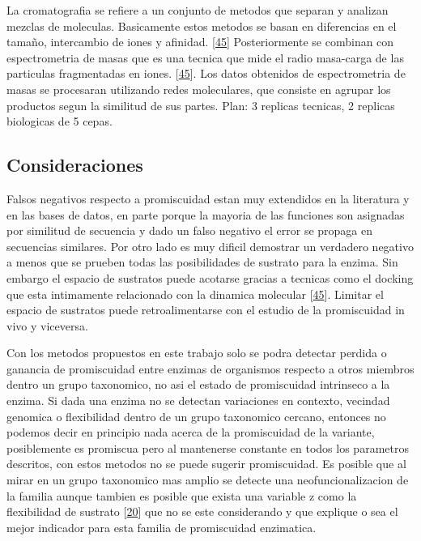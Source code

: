 \documentclass[12pt,twoside]{reedthesis}
\begin{document}
  La cromatografia se refiere a un conjunto de metodos que separan y
  analizan mezclas de moleculas. Basicamente estos metodos se basan en
  diferencias en el tamaño, intercambio de iones y afinidad.
  {[}\protect\hyperlink{ref-campbell_biophysical_2012}{45}{]}
  Posteriormente se combinan con espectrometria de masas que es una
  tecnica que mide el radio masa-carga de las particulas fragmentadas en
  iones. {[}\protect\hyperlink{ref-campbell_biophysical_2012}{45}{]}. Los
  datos obtenidos de espectrometria de masas se procesaran utilizando
  redes moleculares, que consiste en agrupar los productos segun la
  similitud de sus partes. Plan: 3 replicas tecnicas, 2 replicas
  biologicas de 5 cepas.
  
  \subsection{Consideraciones}\label{consideraciones}
  
  Falsos negativos respecto a promiscuidad estan muy extendidos en la
  literatura y en las bases de datos, en parte porque la mayoria de las
  funciones son asignadas por similitud de secuencia y dado un falso
  negativo el error se propaga en secuencias similares. Por otro lado es
  muy dificil demostrar un verdadero negativo a menos que se prueben todas
  las posibilidades de sustrato para la enzima. Sin embargo el espacio de
  sustratos puede acotarse gracias a tecnicas como el docking que esta
  intimamente relacionado con la dinamica molecular
  {[}\protect\hyperlink{ref-campbell_biophysical_2012}{45}{]}. Limitar el
  espacio de sustratos puede retroalimentarse con el estudio de la
  promiscuidad in vivo y viceversa.
  
  Con los metodos propuestos en este trabajo solo se podra detectar
  perdida o ganancia de promiscuidad entre enzimas de organismos respecto
  a otros miembros dentro un grupo taxonomico, no asi el estado de
  promiscuidad intrinseco a la enzima. Si dada una enzima no se detectan
  variaciones en contexto, vecindad genomica o flexibilidad dentro de un
  grupo taxonomico cercano, entonces no podemos decir en principio nada
  acerca de la promiscuidad de la variante, posiblemente es promiscua pero
  al mantenerse constante en todos los parametros descritos, con estos
  metodos no se puede sugerir promiscuidad. Es posible que al mirar en un
  grupo taxonomico mas amplio se detecte una neofuncionalizacion de la
  familia aunque tambien es posible que exista una variable z como la
  flexibilidad de sustrato
  {[}\protect\hyperlink{ref-nobeli_protein_2009}{20}{]} que no se este
  considerando y que explique o sea el mejor indicador para esta familia
  de promiscuidad enzimatica.
  
\end{document}
